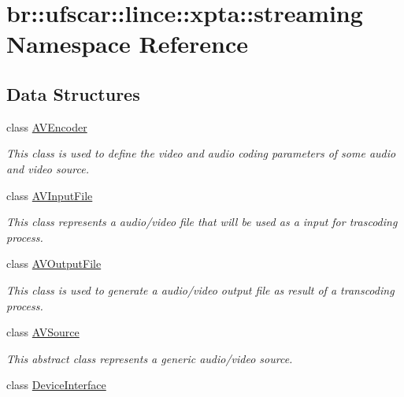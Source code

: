 \hypertarget{namespacebr_1_1ufscar_1_1lince_1_1xpta_1_1streaming}{
\section{br::ufscar::lince::xpta::streaming Namespace Reference}
\label{namespacebr_1_1ufscar_1_1lince_1_1xpta_1_1streaming}
}
\subsection*{Data Structures}
\begin{DoxyCompactItemize}
\item 
class \hyperlink{classbr_1_1ufscar_1_1lince_1_1xpta_1_1streaming_1_1AVEncoder}{AVEncoder}
\begin{DoxyCompactList}\small\item\em This class is used to define the video and audio coding parameters of some audio and video source. \item\end{DoxyCompactList}\item 
class \hyperlink{classbr_1_1ufscar_1_1lince_1_1xpta_1_1streaming_1_1AVInputFile}{AVInputFile}
\begin{DoxyCompactList}\small\item\em This class represents a audio/video file that will be used as a input for trascoding process. \item\end{DoxyCompactList}\item 
class \hyperlink{classbr_1_1ufscar_1_1lince_1_1xpta_1_1streaming_1_1AVOutputFile}{AVOutputFile}
\begin{DoxyCompactList}\small\item\em This class is used to generate a audio/video output file as result of a transcoding process. \item\end{DoxyCompactList}\item 
class \hyperlink{classbr_1_1ufscar_1_1lince_1_1xpta_1_1streaming_1_1AVSource}{AVSource}
\begin{DoxyCompactList}\small\item\em This abstract class represents a generic audio/video source. \item\end{DoxyCompactList}\item 
class \hyperlink{classbr_1_1ufscar_1_1lince_1_1xpta_1_1streaming_1_1DeviceInterface}{DeviceInterface}

\end{DoxyCompactItemize}
